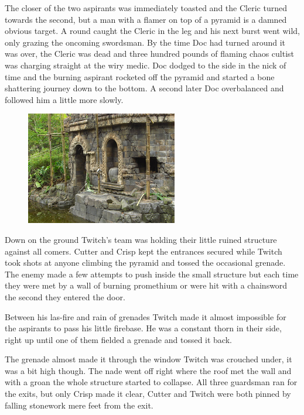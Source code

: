 The closer of the two aspirants was immediately toasted and the Cleric turned towards the second, but a man with a flamer on top of a pyramid is a damned obvious target. 
A round caught the Cleric in the leg and his next burst went wild, only grazing the oncoming swordsman. 
By the time Doc had turned around it was over, the Cleric was dead and three hundred pounds of flaming chaos cultist was charging straight at the wiry medic. 
Doc dodged to the side in the nick of time and the burning aspirant rocketed off the pyramid and started a bone shattering journey down to the bottom. 
A second later Doc overbalanced and followed him a little more slowly.

\begin{figure}
	\begin{center}
		\includegraphics[width=\figwidth]{pics/6/42.png}
	\end{center}
\end{figure}
Down on the ground Twitch's team was holding their little ruined structure against all comers. 
Cutter and Crisp kept the entrances secured while Twitch took shots at anyone climbing the pyramid and tossed the occasional grenade. 
The enemy made a few attempts to push inside the small structure but each time they were met by a wall of burning promethium or were hit with a chainsword the second they entered the door. 

Between his las-fire and rain of grenades Twitch made it almost impossible for the aspirants to pass his little firebase. 
He was a constant thorn in their side, right up until one of them fielded a grenade and tossed it back.

The grenade almost made it through the window Twitch was crouched under, it was a bit high though. 
The nade went off right where the roof met the wall and with a groan the whole structure started to collapse. 
All three guardsman ran for the exits, but only Crisp made it clear, Cutter and Twitch were both pinned by falling stonework mere feet from the exit.

